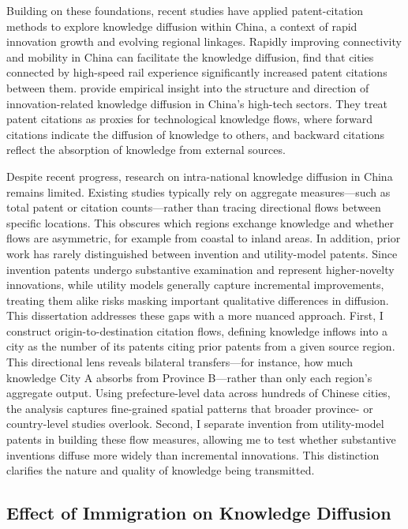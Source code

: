 \documentclass[12pt]{article}
\begin{document}
Building on these foundations, recent studies have applied patent-citation methods to explore knowledge diffusion within China, a context of rapid innovation growth and evolving regional linkages. Rapidly improving connectivity and mobility in China can facilitate the knowledge diffusion, \cite{longInformationEffectsHighspeed2024} find that cities connected by high-speed rail experience significantly increased patent citations between them. \cite{chenKnowledgeFlowsTechnologyintensive2025} provide empirical insight into the structure and direction of innovation-related knowledge diffusion in China's high-tech sectors. They treat patent citations as proxies for technological knowledge flows, where forward citations indicate the diffusion of knowledge to others, and backward citations reflect the absorption of knowledge from external sources. 

Despite recent progress, research on intra-national knowledge diffusion in China remains limited. Existing studies typically rely on aggregate measures—such as total patent or citation counts—rather than tracing directional flows between specific locations. This obscures which regions exchange knowledge and whether flows are asymmetric, for example from coastal to inland areas. In addition, prior work has rarely distinguished between invention and utility-model patents. Since invention patents undergo substantive examination and represent higher-novelty innovations, while utility models generally capture incremental improvements, treating them alike risks masking important qualitative differences in diffusion. This dissertation addresses these gaps with a more nuanced approach. First, I construct origin-to-destination citation flows, defining knowledge inflows into a city as the number of its patents citing prior patents from a given source region. This directional lens reveals bilateral transfers—for instance, how much knowledge City A absorbs from Province B—rather than only each region's aggregate output. Using prefecture-level data across hundreds of Chinese cities, the analysis captures fine-grained spatial patterns that broader province- or country-level studies overlook. Second, I separate invention from utility-model patents in building these flow measures, allowing me to test whether substantive inventions diffuse more widely than incremental innovations. This distinction clarifies the nature and quality of knowledge being transmitted.

\subsection{Effect of Immigration on Knowledge Diffusion} \label{sec:immigration_on_knowledge_diffusion}
\end{document}
